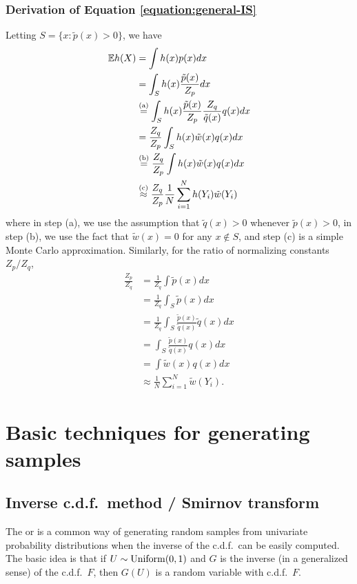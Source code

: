 \documentclass[12pt]{article}
\begin{document}
\subsubsection{Derivation of Equation \ref{equation:general-IS}}
\label{section:IS-derivation}
Letting $S = \{x:\tilde p(x)>0\}$, we have
\begin{align*}
\mathbb{E} h(X) & =  \int h(x) p(x) d x \\
& = \int_S h(x) \frac{\tilde p(x)}{Z_p} d x \\
& \overset{\text{(a)}}{=} \int_S h(x) \frac{\tilde p(x)}{Z_p}\frac{Z_q}{\tilde q(x)} q(x) d x \\
& = \frac{Z_q}{Z_p} \int_S h(x) \tilde w(x) q(x) d x\\
& \overset{\text{(b)}}{=} \frac{Z_q}{Z_p} \int h(x) \tilde w(x) q(x) d x\\
& \overset{\text{(c)}}{\approx} \frac{Z_q}{Z_p} \frac{1}{N}\sum_{i = 1}^N h(Y_i) \tilde w(Y_i)
\end{align*}
where in step (a), we use the assumption that $\tilde q(x)>0$ whenever $\tilde p(x)>0$, in step (b), we use the fact that $\tilde w(x)=0$ for any $x\not\in S$, and step (c) is a simple Monte Carlo approximation.  Similarly, for the ratio of normalizing constants $Z_p/Z_q$,
\begin{align*}
\frac{Z_p}{Z_q} & = \frac{1}{Z_q}\int \tilde p(x) d x\\
& = \frac{1}{Z_q}\int_S \tilde p(x) d x\\
& = \frac{1}{Z_q}\int_S \frac{\tilde p(x)}{\tilde q(x)}\tilde q(x) d x\\
& = \int_S \frac{\tilde p(x)}{\tilde q(x)}q(x) d x\\
& = \int \tilde w(x)q(x) d x\\
& \approx \frac{1}{N}\sum_{i = 1}^N \tilde w(Y_i).
\end{align*}







\section{Basic techniques for generating samples}

\subsection{Inverse c.d.f.\ method / Smirnov transform}

The  or  is a common way of generating random samples from
univariate probability distributions when the inverse of the c.d.f.\ can be easily computed.
The basic idea is that if $U\sim\operatorname*{Uniform}(0,1)$ and $G$ is the inverse (in a generalized sense) of the c.d.f.\ $F$, then $G(U)$ is a random variable with c.d.f.\ $F$.
\end{document}

